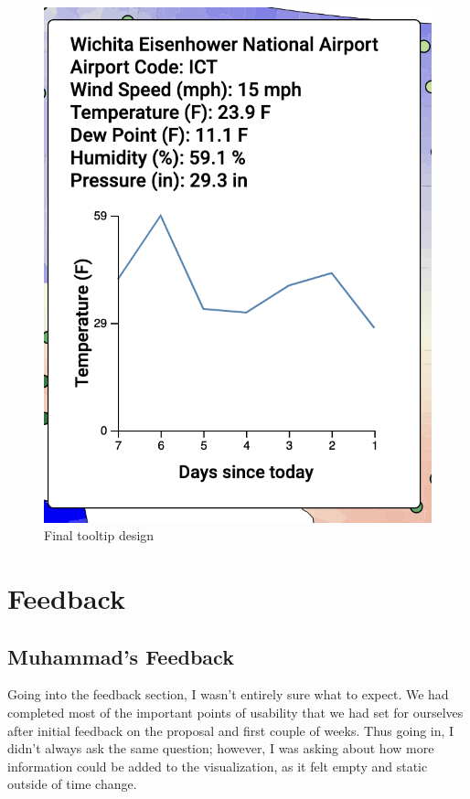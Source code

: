 \documentclass[9pt,twocolumn,twoside]{opticajnl}
\begin{document}
\begin{figure}
    \centering
    \includegraphics[scale=0.5]{images/img9.png}
    \caption{Final tooltip design}
\end{figure}

\section {Feedback}

\subsection{Muhammad's Feedback}
Going into the feedback section, I wasn't entirely sure what to expect. We had completed most of the important points of usability that we had set for ourselves after initial feedback on the proposal and first couple of weeks. Thus going in, I didn't always ask the same question; however, I was asking about how more information could be added to the visualization, as it felt empty and static outside of time change. 
\end{document}
